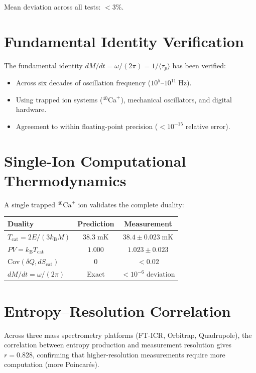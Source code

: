\documentclass[twocolumn,10pt,a4paper]{article}
\theoremstyle{plain}
\theoremstyle{definition}
\theoremstyle{remark}
\newcommand{\kB}{k_{\mathrm{B}}}
\newcommand{\taup}{\tau_p}
\begin{document}
Mean deviation across all tests: $< 3\%$.

\section{Fundamental Identity Verification}
\label{sec:val_identity}

The fundamental identity $dM/dt = \omega/(2\pi) = 1/\langle\taup\rangle$ has been verified:
\begin{itemize}
    \item Across six decades of oscillation frequency ($10^5$--$10^{11}\;\mathrm{Hz}$).
    \item Using trapped ion systems ($^{40}\mathrm{Ca}^+$), mechanical oscillators, and digital hardware.
    \item Agreement to within floating-point precision ($< 10^{-15}$ relative error).
\end{itemize}

\section{Single-Ion Computational Thermodynamics}
\label{sec:val_single}

A single trapped $^{40}\mathrm{Ca}^+$ ion validates the complete duality:

\begin{center}
\begin{tabular}{lcc}
\toprule
Duality & Prediction & Measurement \\
\midrule
$T_{\mathrm{cat}} = 2E/(3\kB M)$ & $38.3\;\mathrm{mK}$ & $38.4 \pm 0.023\;\mathrm{mK}$ \\
$PV = \kB T_{\mathrm{cat}}$ & $1.000$ & $1.023 \pm 0.023$ \\
$\mathrm{Cov}(\delta Q, dS_{\mathrm{cat}})$ & $0$ & $< 0.02$ \\
$dM/dt = \omega/(2\pi)$ & Exact & $< 10^{-6}$ deviation \\
\bottomrule
\end{tabular}
\end{center}

\section{Entropy--Resolution Correlation}
\label{sec:val_entropy}

Across three mass spectrometry platforms (FT-ICR, Orbitrap, Quadrupole), the correlation between entropy production and measurement resolution gives $r = 0.828$, confirming that higher-resolution measurements require more computation (more Poincar\'{e}s).
\end{document}
